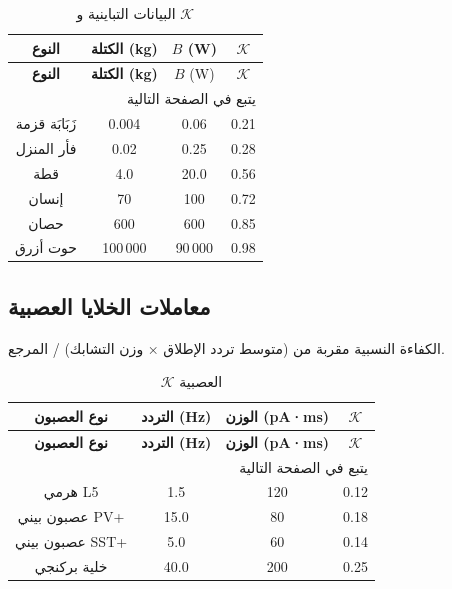 \documentclass[11pt,a4paper]{article}
\newcommand{\REL}{\mathcal{K}}
\begin{document}
	\begin{longtable}{|c|c|c|c|}
		\caption{البيانات التباينية و \(\REL\)}\label{tab:allometry}\\
		\hline
		\textbf{النوع} & \textbf{الكتلة (kg)} & \(B\) (W) & \(\REL\) \\
		\hline
		\endfirsthead
		\hline
		\textbf{النوع} & \textbf{الكتلة (kg)} & \(B\) (W) & \(\REL\) \\
		\hline
		\endhead
		\hline
		\multicolumn{4}{r}{يتبع في الصفحة التالية}\\
		\endfoot
		\hline
		\endlastfoot
		زَبَابَة قزمة & 0.004 & 0.06 & 0.21 \\
		فأر المنزل & 0.02 & 0.25 & 0.28 \\
		قطة & 4.0 & 20.0 & 0.56 \\
		إنسان & 70 & 100 & 0.72 \\
		حصان & 600 & 600 & 0.85 \\
		حوت أزرق & 100\,000 & 90\,000 & 0.98 \\
		\hline
	\end{longtable}
	
	\subsection{معاملات الخلايا العصبية}
	\label{sec:neural}
	الكفاءة النسبية مقربة من (متوسط تردد الإطلاق × وزن التشابك) / المرجع.
	
	\begin{longtable}{|c|c|c|c|}
		\caption{\(\REL\) العصبية}\label{tab:neural}\\
		\hline
		\textbf{نوع العصبون} & \textbf{التردد (Hz)} & \textbf{الوزن (pA·ms)} & \(\REL\) \\
		\hline
		\endfirsthead
		\hline
		\textbf{نوع العصبون} & \textbf{التردد (Hz)} & \textbf{الوزن (pA·ms)} & \(\REL\) \\
		\hline
		\endhead
		\hline
		\multicolumn{4}{r}{يتبع في الصفحة التالية}\\
		\endfoot
		\hline
		\endlastfoot
		هرمي L5 & 1.5 & 120 & 0.12 \\
		عصبون بيني PV+ & 15.0 & 80 & 0.18 \\
		عصبون بيني SST+ & 5.0 & 60 & 0.14 \\
		خلية بركنجي & 40.0 & 200 & 0.25 \\
		\hline
	\end{longtable}
	
\end{document}
